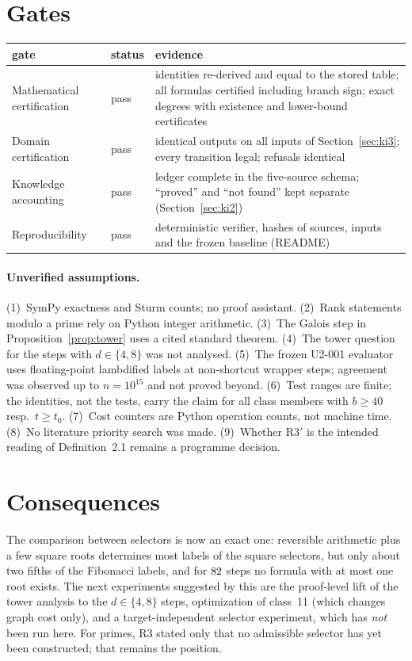 \documentclass[11pt]{article}
\theoremstyle{definition}
\theoremstyle{remark}
\begin{document}
\section{Gates}
\begin{center}\small
\begin{tabular}{@{}p{}p{}p{}@{}}\toprule
gate & status & evidence\\\midrule
Mathematical certification & pass & \StepsAll{} identities re-derived and equal to the stored table; all \ClosedAll{} formulas certified including branch sign; \NonClosed{} exact degrees with existence and lower-bound certificates\\
Domain certification & pass & identical outputs on all inputs of Section~\ref{sec:ki3}; every transition legal; refusals identical\\
Knowledge accounting & pass & ledger complete in the five-source schema; ``proved'' and ``not found'' kept separate (Section~\ref{sec:ki2})\\
Reproducibility & pass & deterministic verifier, hashes of sources, inputs and the frozen baseline (README)\\\bottomrule
\end{tabular}
\end{center}
\paragraph{Unverified assumptions.} (1)~SymPy exactness and Sturm counts; no proof assistant. (2)~Rank statements modulo a prime rely on Python integer arithmetic. (3)~The Galois step in Proposition~\ref{prop:tower} uses a cited standard theorem. (4)~The tower question for the \FieldPowTwo{} steps with $d\in\{4,8\}$ was not analysed. (5)~The frozen U2-001 evaluator uses floating-point lambdified labels at non-shortcut wrapper steps; agreement was observed up to $n=10^{15}$ and not proved beyond. (6)~Test ranges are finite; the identities, not the tests, carry the claim for all class members with $b\ge40$ resp.\ $t\ge t_0$. (7)~Cost counters are Python operation counts, not machine time. (8)~No literature priority search was made. (9)~Whether R3$'$ is the intended reading of Definition~2.1 remains a programme decision.

\section{Consequences}
The comparison between selectors is now an exact one: reversible arithmetic plus a few square roots determines most labels of the square selectors, but only about two fifths of the Fibonacci labels, and for $82$ steps no formula with at most one root exists. The next experiments suggested by this are the proof-level lift of the tower analysis to the $d\in\{4,8\}$ steps, optimization of class~11 (which changes graph cost only), and a target-independent selector experiment, which has \emph{not} been run here. For primes, R3 stated only that no admissible selector has yet been constructed; that remains the position.
\end{document}
